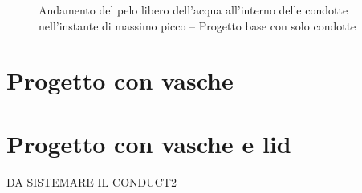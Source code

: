\begin{figure}[p]
\caption{Andamento del pelo libero dell'acqua all'interno delle condotte nell'instante di massimo picco -- Progetto base con solo condotte}
\label{fig:ProfiliProgettoCondotte}
\end{figure}

\clearpage
\section{Progetto con vasche}

\section{Progetto con vasche e lid}
DA SISTEMARE IL CONDUCT2



